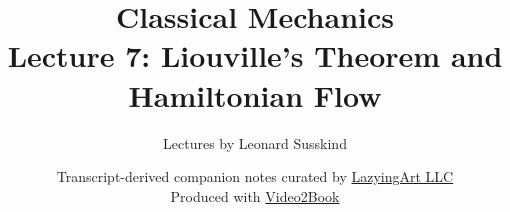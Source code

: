 \documentclass[11pt,oneside]{book}
\begin{document}
\hypersetup{pageanchor=false}
\frontmatter
\title{Classical Mechanics\\[0.45em]
\large Lecture 7: Liouville's Theorem and Hamiltonian Flow}
\author{Lectures by Leonard Susskind}
\date{Transcript-derived companion notes curated by
\href{https://lazying.art}{LazyingArt LLC}\\[0.35em]
\small Produced with
\href{https://github.com/lachlanchen/Video2Book}{Video2Book}}
\maketitle
\hypersetup{pageanchor=true}
\mainmatter

\end{document}
